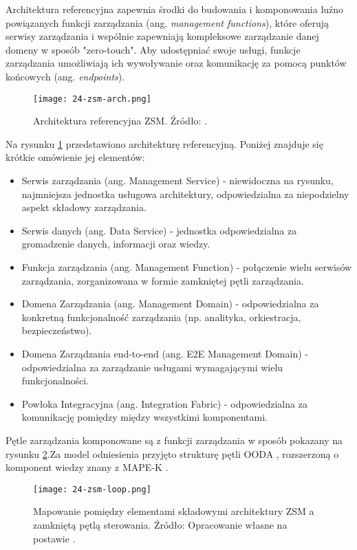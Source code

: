 Architektura referencyjna zapewnia środki do budowania i komponowania luźno powiązanych funkcji zarządzania (ang. \textit{management functions}), które oferują serwisy zarządzania i wspólnie zapewniają kompleksowe zarządzanie danej domeny w sposób "zero-touch". Aby udostępniać swoje usługi, funkcje zarządzania umożliwiają ich wywoływanie oraz komunikację za pomocą punktów końcowych (ang. \textit{endpoints}).

\begin{figure}[!htbp]
    \centering \texttt{[image: 24-zsm-arch.png]}
    \caption{Architektura referencyjna ZSM. Źródło: \cite{etsizsm2018}.}\label{fig:24-zsm-arch}
\end{figure}

Na rysunku \ref{fig:24-zsm-arch} przedstawiono architekturę referencyjną. Poniżej znajduje się krótkie omówienie jej elementów:
\begin{itemize}
    \item Serwis zarządzania (ang. Management Service) - niewidoczna na rysunku, najmniejsza jednostka usługowa architektury, odpowiedzialna za niepodzielny aspekt składowy zarządzania.
    \item Serwis danych (ang. Data Service) - jednostka odpowiedzialna za gromadzenie danych, informacji oraz wiedzy.
    \item Funkcja zarządzania (ang. Management Function) - połączenie wielu serwisów zarządzania, zorganizowana w formie zamkniętej pętli zarządzania.
    \item Domena Zarządzania (ang. Management Domain) - odpowiedzialna za konkretną funkcjonalność zarządzania (np. analityka, orkiestracja, bezpieczeństwo).
    \item Domena Zarządzania end-to-end (ang. E2E Management Domain) - odpowiedzialna za zarządzanie usługami wymagającymi wielu funkcjonalności.
    \item Powłoka Integracyjna (ang. Integration Fabric) - odpowiedzialna za komunikację pomiędzy między wszystkimi komponentami.
\end{itemize}

Pętle zarządzania komponowane są z funkcji zarządzania w sposób pokazany na rysunku \ref{fig:24-zsm-loop}.Za model odniesienia przyjęto strukturę pętli OODA \cite{boyd1995}, rozszerzoną o komponent wiedzy znany z MAPE-K \cite{kephart2003}.

\begin{figure}[!htbp]
    \centering \texttt{[image: 24-zsm-loop.png]}
    \caption{Mapowanie pomiędzy elementami składowymi architektury ZSM a zamkniętą pętlą sterowania. Źródło: Opracowanie własne na postawie \cite{etsizsm2019}.}\label{fig:24-zsm-loop}
\end{figure}


